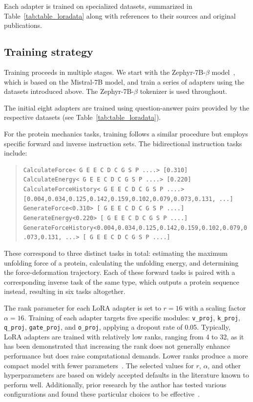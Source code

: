 Each adapter is trained on specialized datasets, summarized in Table~\ref{tab:table_loradata} along with references to their sources and original publications.

\subsection{Training strategy} Training proceeds in multiple stages. We start with the Zephyr-7B-$\beta$ model~\cite{HuggingFaceH4/zephyr-7b-betaFace}, which is based on the Mistral-7B model\cite{Jiang2023Mistral7B}, and train a series of adapters using the datasets introduced above. The Zephyr-7B-$\beta$ tokenizer is used throughout.

The initial eight adapters are trained using question-answer pairs provided by the respective datasets (see Table~\ref{tab:table_loradata}).

For the protein mechanics tasks, training follows a similar procedure but employs specific forward and inverse instruction sets. The bidirectional instruction tasks include:

\begin{quote}
\tiny {\texttt{CalculateForce< G E E C D C G S P ....> [0.310]\\
CalculateEnergy< G E E C D C G S P ....> [0.220]\\ 
CalculateForceHistory< G E E C D C G S P ....> [0.004,0.034,0.125,0.142,0.159,0.102,0.079,0.073,0.131, ...]\\
GenerateForce<0.310>\,[ G E E C D C G S P ....]\\
GenerateEnergy<0.220>\,[ G E E C D C G S P ....]\\
GenerateForceHistory<0.004,0.034,0.125,0.142,0.159,0.102,0.079,0.073,0.131, ...>\,[ G E E C D C G S P ....] }}
\end{quote}

These correspond to three distinct tasks in total: estimating the maximum unfolding force of a protein, calculating the unfolding energy, and determining the force-deformation trajectory. Each of these forward tasks is paired with a corresponding inverse task of the same type, which outputs a protein sequence instead, resulting in six tasks altogether.

The rank parameter for each LoRA adapter is set to $r=16$ with a scaling factor $\alpha=16$. Training of each adapter targets five specific modules: \texttt{v\_proj}, \texttt{k\_proj}, \texttt{q\_proj}, \texttt{gate\_proj}, and \texttt{o\_proj}, applying a dropout rate of 0.05. Typically, LoRA adapters are trained with relatively low ranks, ranging from 4 to 32, as it has been demonstrated that increasing the rank does not generally enhance performance but does raise computational demands. Lower ranks produce a more compact model with fewer parameters~\cite{hu2021lora}. The selected values for $r$, $\alpha$, and other hyperparameters are based on widely accepted defaults in the literature known to perform well. Additionally, prior research by the author has tested various configurations and found these particular choices to be effective~\cite{Luu2023BioinspiredLLM:Materials}.

